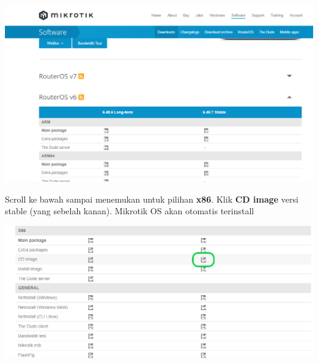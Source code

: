 \documentclass{article}
\begin{document}
\begin{flushleft}
\begin{itemize}
				\begin{center}
					\includegraphics[scale=0.3]{routerOS} \\
				\end{center}
				
				Scroll ke bawah sampai menemukan untuk pilihan \textbf{x86}. Klik \textbf{CD image} versi stable (yang sebelah kanan). Mikrotik OS akan otomatis terinstall
				\begin{center}
					\includegraphics[scale=0.3]{routerOS2} \\
				\end{center}				 
 				        	
        	
        \end{itemize}

    \end{flushleft}
\end{document}
